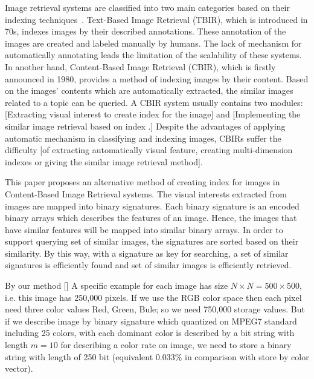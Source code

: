 \documentclass{amcs}
\begin{document}
Image retrieval systems are classified into two main categories based on their indexing techniques~\cite{}. Text-Based Image Retrieval (TBIR), which is introduced in 70s, indexes images by their described annotations. These annotation of the images are created and labeled manually by humans. The lack of mechanism for automatically annotating leads the limitation of the scalability of these systems. In another hand, Content-Based Image Retrieval (CBIR), which is firstly announced in 1980, provides a method of indexing images by their content. Based on the images' contents which are automatically extracted, the similar images related to a topic can be queried. A CBIR system usually contains two modules: [Extracting visual interest to create index for the image] and [Implementing the similar image retrieval based on index \cite{}.] Despite the advantages of applying automatic mechanism in classifying and indexing images, CBIRs suffer the difficulty [of extracting automatically visual feature, creating multi-dimension indexes or giving the similar image retrieval method].

This paper proposes an alternative method of creating index for images in Content-Based Image Retrieval systems. The visual interests extracted from images are mapped into binary signatures. Each binary signature is an encoded binary arrays which describes the features of an image. Hence, the images that have similar features will be mapped into similar binary arrays. In order to support querying set of similar images, the signatures are sorted based on their similarity. By this way, with a signature as key for searching, a set of similar signatures is efficiently found and set of similar images is efficiently retrieved. 

By our method []
A specific example for each image has size $N \times N = 500 \times 500$, i.e. this image has 250,000 pixels. If we use the RGB color space then each pixel need three color values Red, Green, Bule; so we need 750,000 storage values. But if we describe image by binary signature which quantized on MPEG7 standard including 25 colors, with each dominant color is described by a bit string with length $m=10$ for describing a color rate on image, we need to store a binary string with length of 250 bit (equivalent 0.033\% in comparison with store by color vector).

\end{document}
